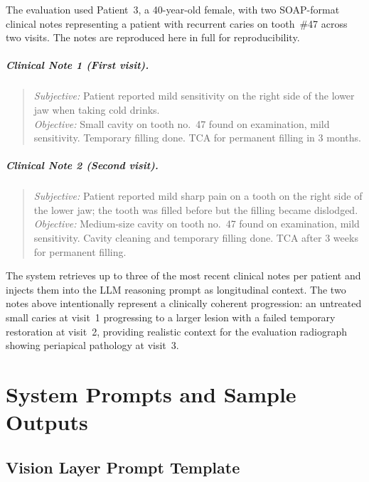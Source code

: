\documentclass[12pt,a4paper]{report}
\begin{document}
The evaluation used Patient~3, a 40-year-old female, with two SOAP-format
clinical notes representing a patient with recurrent caries on tooth~\#47
across two visits. The notes are reproduced here in full for reproducibility.

\paragraph{Clinical Note 1 (First visit).}
\begin{quote}
\textit{Subjective:} Patient reported mild sensitivity on the right side of
the lower jaw when taking cold drinks. \\
\textit{Objective:} Small cavity on tooth no.~47 found on examination, mild
sensitivity. Temporary filling done. TCA for permanent filling in 3 months.
\end{quote}

\paragraph{Clinical Note 2 (Second visit).}
\begin{quote}
\textit{Subjective:} Patient reported mild sharp pain on a tooth on the right
side of the lower jaw; the tooth was filled before but the filling became
dislodged. \\
\textit{Objective:} Medium-size cavity on tooth no.~47 found on examination,
mild sensitivity. Cavity cleaning and temporary filling done. TCA after 3
weeks for permanent filling.
\end{quote}

The system retrieves up to three of the most recent clinical notes per patient
and injects them into the LLM reasoning prompt as longitudinal context. The
two notes above intentionally represent a clinically coherent progression:
an untreated small caries at visit~1 progressing to a larger lesion with a
failed temporary restoration at visit~2, providing realistic context for the
evaluation radiograph showing periapical pathology at visit~3.

\chapter{System Prompts and Sample Outputs}
\label{app:prompts}

\section{Vision Layer Prompt Template}
\end{document}
